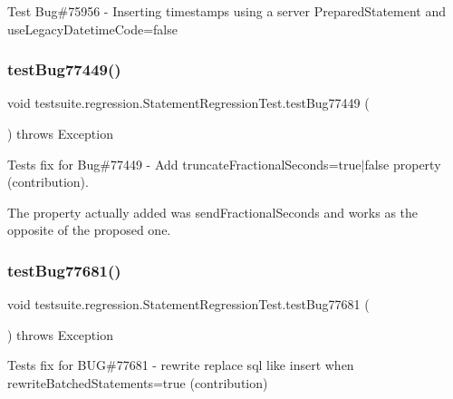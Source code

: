 Test Bug\#75956 -\/ Inserting timestamps using a server Prepared\+Statement and use\+Legacy\+Datetime\+Code=false \mbox{\label{classtestsuite_1_1regression_1_1_statement_regression_test_a07a77723b5e6ea623ee8d6c78d7786af}} 
\subsubsection{\texorpdfstring{test\+Bug77449()}{testBug77449()}}
{\footnotesize\ttfamily void testsuite.\+regression.\+Statement\+Regression\+Test.\+test\+Bug77449 (\begin{DoxyParamCaption}{ }\end{DoxyParamCaption}) throws Exception}

Tests fix for Bug\#77449 -\/ Add \textquotesingle{}truncate\+Fractional\+Seconds=true$\vert$false\textquotesingle{} property (contribution).

The property actually added was \textquotesingle{}send\+Fractional\+Seconds\textquotesingle{} and works as the opposite of the proposed one. \mbox{\label{classtestsuite_1_1regression_1_1_statement_regression_test_adc52d5ddc30d4e6b82fb24fd1c544d26}} 
\subsubsection{\texorpdfstring{test\+Bug77681()}{testBug77681()}}
{\footnotesize\ttfamily void testsuite.\+regression.\+Statement\+Regression\+Test.\+test\+Bug77681 (\begin{DoxyParamCaption}{ }\end{DoxyParamCaption}) throws Exception}

Tests fix for B\+UG\#77681 -\/ rewrite replace sql like insert when rewrite\+Batched\+Statements=true (contribution)

